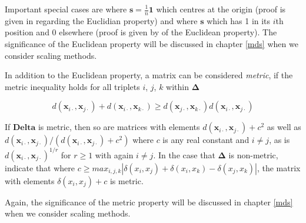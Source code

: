 Important special cases are where $\boldsymbol{s} = \frac{1}{n}\boldsymbol{1}$ which centres at the origin (proof is given in \cite{Mardia+etal:1979} regarding the Euclidian property) and where $\boldsymbol{s}$ which has 1 in its $i$th position and 0 elsewhere (proof is given by \cite{Gower:1984} of the Euclidean property).   The significance of the Euclidean property will be discussed in chapter \ref{mds} when we consider scaling methods.


In addition to the Euclidean property, a matrix can be considered \emph{metric}, if the metric inequality holds for all triplets $i$, $j$, $k$ within $\boldsymbol{\Delta}$

\begin{equation}
\label{triangleinequality}
d(\boldsymbol{x}_{i\cdot}, \boldsymbol{x}_{j\cdot}) + d(\boldsymbol{x}_{i\cdot}, \boldsymbol{x}_{k\cdot}) \geq d(\boldsymbol{x}_{j\cdot}, \boldsymbol{x}_{k\cdot})d(\boldsymbol{x}_{i\cdot}, \boldsymbol{x}_{j\cdot})
\end{equation}

If $\boldsymbol{Delta}$ is metric, then so are matrices with elements 
$d(\boldsymbol{x}_{i\cdot}, \boldsymbol{x}_{j\cdot}) + c^{2}$ as well as $d(\boldsymbol{x}_{i\cdot}, \boldsymbol{x}_{j\cdot}) /( d(\boldsymbol{x}_{i\cdot}, \boldsymbol{x}_{j\cdot}) + c^{2})$ where $c$ is any real constant and $i\neq j$, as is  $d(\boldsymbol{x}_{i\cdot}, \boldsymbol{x}_{j\cdot})^{1/r}$ for $r \geq 1$ with again $i \neq j$.    In the case that $\boldsymbol{\Delta}$ is non-metric, \cite{Krzanowski+Marriott:1994I} indicate that where $c \geq max_{i,j,k} |\delta(x_{i},x_{j}) + \delta(x_{i},x_{k}) - \delta(x_{j},x_{k})|$, the matrix with elements $\delta(x_{i},x_{j}) + c$ is metric.


Again, the significance of the metric property will be discussed in chapter \ref{mds} when we consider scaling methods.



